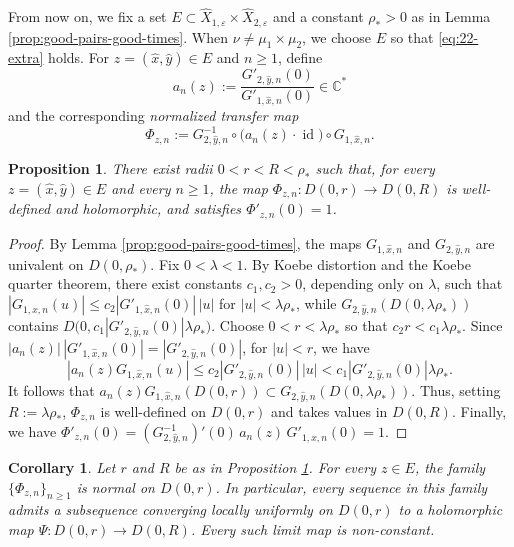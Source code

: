 \documentclass[11pt]{amsart}
\numberwithin{equation}{section}
\theoremstyle{plain}
\newtheorem{cor}[thm]{Corollary}
\newtheorem{prop}[thm]{Proposition}
\theoremstyle{definition}
\theoremstyle{remark}
\begin{document}
From now on, we fix a set
$E\subset
\hat X_{1,\varepsilon}\times\hat X_{2,\varepsilon}$
and a constant $\rho_*>0$ as in Lemma
\ref{prop:good-pairs-good-times}. When
$\nu\neq\mu_1\times\mu_2$, we choose $E$ so that \eqref{eq:22-extra} holds.
For
$z=(\hat x,\hat y)\in E$
and $n\geq1$, define
$$
a_n(z)
:=
\frac{G'_{2,\hat y,n}(0)}
     {G'_{1,\hat x,n}(0)}
\in\mathbb C^*
$$
and the corresponding \emph{normalized transfer map}
$$
\Phi_{z,n}
:=
G_{2,\hat y,n}^{-1}
\circ
\bigl(a_n(z)\cdot\operatorname{id}\bigr)
\circ
G_{1,\hat x,n}.
$$

\begin{prop}\label{prop:transfer-maps}
There exist radii $0<r<R<\rho_*$ such that, for every
$z=(\hat x,\hat y)\in E$ and every $n\geq1$, the map
$
\Phi_{z,n}\colon D(0,r)\to D(0,R)
$
is well-defined and holomorphic, and satisfies
$\Phi'_{z,n}(0)=1$.
\end{prop}

\begin{proof}
By Lemma \ref{prop:good-pairs-good-times}, the maps
$G_{1,\hat x,n}$ and $G_{2,\hat y,n}$ are univalent on
$D(0,\rho_*)$.
Fix $0<\lambda<1$.
By Koebe distortion and the Koebe quarter theorem, there exist
constants $c_1,c_2>0$, depending only on $\lambda$, such that
$|G_{1,\hat x,n}(u)|
\leq
c_2|G'_{1,\hat x,n}(0)|\,|u|$
for $|u|<\lambda\rho_*$, while
$G_{2,\hat y,n}(D(0,\lambda\rho_*))$ contains
$
D\bigl(
0,c_1|G'_{2,\hat y,n}(0)|\lambda\rho_*
\bigr)$.
Choose $0<r<\lambda\rho_*$ so that
$c_2r<c_1\lambda\rho_*$. 
Since
$
|a_n(z)|\,|G'_{1,\hat x,n}(0)|
=
|G'_{2,\hat y,n}(0)|$, 
for $|u|<r$, we have
$$
|a_n(z)G_{1,\hat x,n}(u)|
\leq
c_2|G'_{2,\hat y,n}(0)|\,|u|
<
c_1|G'_{2,\hat y,n}(0)|\lambda\rho_*.
$$
It follows that
$
a_n(z)G_{1,\hat x,n}(D(0,r))
\subset
G_{2,\hat y,n}(D(0,\lambda\rho_*)).
$
Thus, setting $R:=\lambda\rho_*$, $\Phi_{z,n}$ is well-defined on $D(0,r)$ and takes values in
$D(0,R)$.
Finally, we have
$
\Phi'_{z,n}(0)
=
(G_{2,\hat y,n}^{-1})'(0)\,
a_n(z)\,
G'_{1,\hat x,n}(0)
=
1$. 
\end{proof}

\begin{cor}\label{cor:normal-family}
Let $r$ and $R$ be as in Proposition \ref{prop:transfer-maps}.
For every $z\in E$, the family
$\{\Phi_{z,n}\}_{n\geq1}$
is normal on $D(0,r)$. In particular, every sequence in this family
admits a subsequence converging locally uniformly on $D(0,r)$ to a
holomorphic map
$\Psi\colon D(0,r)\to D(0,R)$.
Every such limit map is non-constant.
\end{cor}
\end{document}
